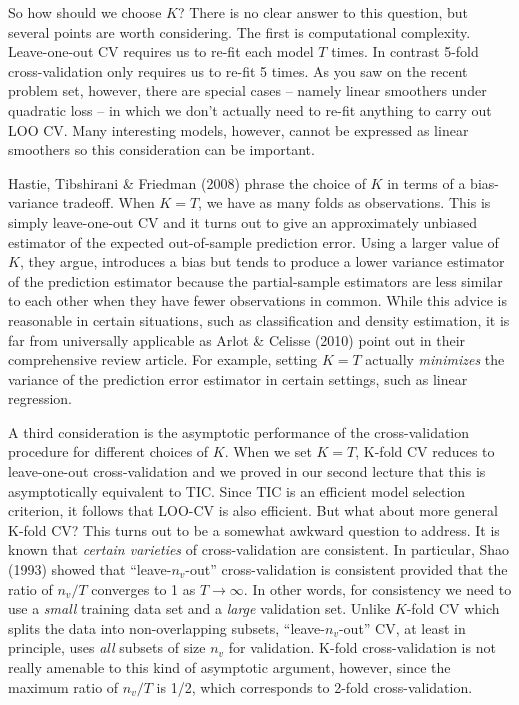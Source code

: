 So how should we choose $K$? There is no clear answer to this question, but several points are worth considering. The first is computational complexity. Leave-one-out CV requires us to re-fit each model $T$ times. In contrast 5-fold cross-validation only requires us to re-fit 5 times. As you saw on the recent problem set, however, there are special cases -- namely linear smoothers under quadratic loss -- in which we don't actually need to re-fit anything to carry out LOO CV. Many interesting models, however, cannot be expressed as linear smoothers so this consideration can be important. 

Hastie, Tibshirani \& Friedman (2008) phrase the choice of $K$ in terms of a bias-variance tradeoff. When $K = T$, we have as many folds as observations. This is simply leave-one-out CV and it turns out to give an approximately unbiased estimator of the expected out-of-sample prediction error. Using a larger value of $K$, they argue, introduces a bias but tends to produce a lower variance estimator of the prediction estimator because the partial-sample estimators are less similar to each other when they have fewer observations in common. While this advice is reasonable in certain situations, such as classification and density estimation, it is far from universally applicable as Arlot \& Celisse (2010) point out in their comprehensive review article. For example, setting $K=T$ actually \emph{minimizes} the variance of the prediction error estimator in certain settings, such as linear regression.

A third consideration is the asymptotic performance of the cross-validation procedure for different choices of $K$. When we set $K = T$, K-fold CV reduces to leave-one-out cross-validation and we proved in our second lecture that this is asymptotically equivalent to TIC. Since TIC is an efficient model selection criterion, it follows that LOO-CV is also efficient. But what about more general K-fold CV? This turns out to be a somewhat awkward question to address. It is known that \emph{certain varieties} of cross-validation are consistent. In particular, Shao (1993) showed that ``leave-$n_v$-out'' cross-validation is consistent provided that the ratio of $n_v/T$ converges to 1 as $T\rightarrow \infty$. In other words, for consistency we need to use a \emph{small} training data set and a \emph{large} validation set. Unlike $K$-fold CV which splits the data into non-overlapping subsets, ``leave-$n_v$-out'' CV, at least in principle, uses \emph{all} subsets of size $n_v$ for validation. K-fold cross-validation is not really amenable to this kind of asymptotic argument, however, since the maximum ratio of $n_v/T$ is 1/2, which corresponds to 2-fold cross-validation. 

